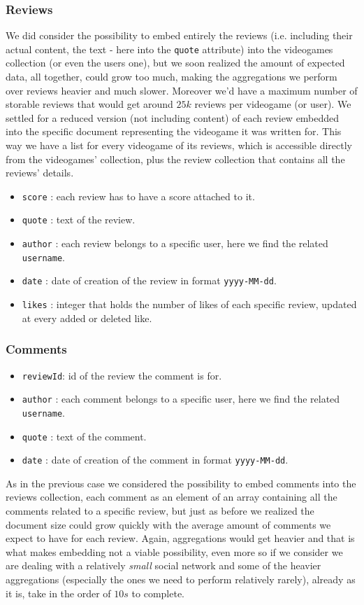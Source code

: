 \subsubsection{Reviews}
We did consider the possibility to embed entirely the reviews (i.e. including their actual content, the text - here into the \texttt{quote} attribute) into the videogames collection (or even the users one), but we soon realized the amount of expected data, all together, could grow too much, making the aggregations we perform over reviews heavier and much slower. Moreover we'd have a maximum number of storable reviews that would get around $25k$ reviews per videogame (or user). We settled for a reduced version (not including content) of each review embedded into the specific document representing the videogame it was written for. This way we have a list for every videogame of its reviews, which is accessible directly from the videogames' collection, plus the review collection that contains all the reviews' details.
\begin{itemize}
    \item \texttt{score} : each review has to have a score attached to it.
    \item \texttt{quote} : text of the review.
    \item \texttt{author} : each review belongs to a specific user, here we find the related \texttt{username}.
    \item \texttt{date} : date of creation of the review in format \texttt{yyyy-MM-dd}.
    \item \texttt{likes} : integer that holds the number of likes of each specific review, updated at every added or deleted like.
\end{itemize}
\subsubsection{Comments}
\begin{itemize}
    \item \texttt{reviewId}: id of the review the comment is for.
    \item \texttt{author} : each comment belongs to a specific user, here we find the related \texttt{username}. 
    \item \texttt{quote} : text of the comment.
    \item \texttt{date} : date of creation of the comment in format \texttt{yyyy-MM-dd}.
\end{itemize}
As in the previous case we considered the possibility to embed comments into the reviews collection, each comment as an element of an array containing all the comments related to a specific review, but just as before we realized the document size could grow quickly with the average amount of comments we expect to have for each review. Again, aggregations would get heavier and that is what makes embedding not a viable possibility, even more so if we consider we are dealing with a relatively \emph{small} social network and some of the heavier aggregations (especially the ones we need to perform relatively rarely), already as it is, take in the order of $10s$ to complete. 
